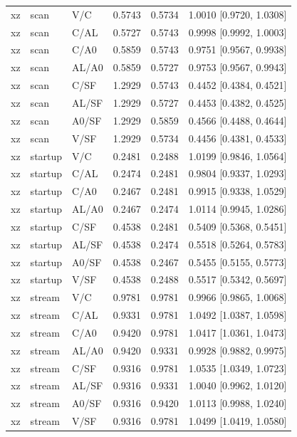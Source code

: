 \begin{longtable}{lllrrl}
xz & scan & V/C & 0.5743 & 0.5734 & 1.0010 [0.9720, 1.0308] \\
xz & scan & C/AL & 0.5727 & 0.5743 & 0.9998 [0.9992, 1.0003] \\
xz & scan & C/A0 & 0.5859 & 0.5743 & 0.9751 [0.9567, 0.9938] \\
xz & scan & AL/A0 & 0.5859 & 0.5727 & 0.9753 [0.9567, 0.9943] \\
xz & scan & C/SF & 1.2929 & 0.5743 & 0.4452 [0.4384, 0.4521] \\
xz & scan & AL/SF & 1.2929 & 0.5727 & 0.4453 [0.4382, 0.4525] \\
xz & scan & A0/SF & 1.2929 & 0.5859 & 0.4566 [0.4488, 0.4644] \\
xz & scan & V/SF & 1.2929 & 0.5734 & 0.4456 [0.4381, 0.4533] \\
xz & startup & V/C & 0.2481 & 0.2488 & 1.0199 [0.9846, 1.0564] \\
xz & startup & C/AL & 0.2474 & 0.2481 & 0.9804 [0.9337, 1.0293] \\
xz & startup & C/A0 & 0.2467 & 0.2481 & 0.9915 [0.9338, 1.0529] \\
xz & startup & AL/A0 & 0.2467 & 0.2474 & 1.0114 [0.9945, 1.0286] \\
xz & startup & C/SF & 0.4538 & 0.2481 & 0.5409 [0.5368, 0.5451] \\
xz & startup & AL/SF & 0.4538 & 0.2474 & 0.5518 [0.5264, 0.5783] \\
xz & startup & A0/SF & 0.4538 & 0.2467 & 0.5455 [0.5155, 0.5773] \\
xz & startup & V/SF & 0.4538 & 0.2488 & 0.5517 [0.5342, 0.5697] \\
xz & stream & V/C & 0.9781 & 0.9781 & 0.9966 [0.9865, 1.0068] \\
xz & stream & C/AL & 0.9331 & 0.9781 & 1.0492 [1.0387, 1.0598] \\
xz & stream & C/A0 & 0.9420 & 0.9781 & 1.0417 [1.0361, 1.0473] \\
xz & stream & AL/A0 & 0.9420 & 0.9331 & 0.9928 [0.9882, 0.9975] \\
xz & stream & C/SF & 0.9316 & 0.9781 & 1.0535 [1.0349, 1.0723] \\
xz & stream & AL/SF & 0.9316 & 0.9331 & 1.0040 [0.9962, 1.0120] \\
xz & stream & A0/SF & 0.9316 & 0.9420 & 1.0113 [0.9988, 1.0240] \\
xz & stream & V/SF & 0.9316 & 0.9781 & 1.0499 [1.0419, 1.0580] \\
\bottomrule\end{longtable}

